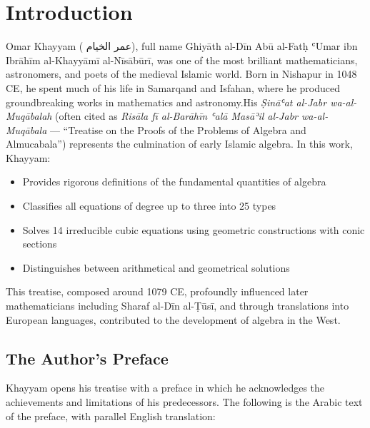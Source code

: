 \clearpage

\tableofcontents

\clearpage

\section{Introduction}

\label{sec:intro}

Omar Khayyam (
\textarabic{عمر الخيام}), full name Ghiyāth al-Dīn Abū al-Fatḥ ʿUmar ibn Ibrāhīm al-Khayyāmī al-Nīsābūrī, was one of the most brilliant mathematicians, astronomers, and poets of the medieval Islamic world. Born in Nishapur in 1048 CE, he spent much of his life in Samarqand and Isfahan, where he produced groundbreaking works in mathematics and astronomy.His 
\textit{Ṣināʿat al-Jabr wa-al-Muqābalah} (often cited as 
\textit{Risāla fī al-Barāhīn ʿalā Masāʾil al-Jabr wa-al-Muqābala} --- ``Treatise on the Proofs of the Problems of Algebra and Almucabala'') represents the culmination of early Islamic algebra. In this work, Khayyam:

\begin{itemize}
[noitemsep]
\item Provides rigorous definitions of the fundamental quantities of algebra
\item Classifies all equations of degree up to three into 25 types
\item Solves 14 irreducible cubic equations using geometric constructions with conic sections
\item Distinguishes between arithmetical and geometrical solutions

\end{itemize}
This treatise, composed around 1079 CE, profoundly influenced later mathematicians including Sharaf al-Dīn al-Ṭūsī, and through translations into European languages, contributed to the development of algebra in the West.

\subsection{The Author's Preface}

\label{subsec:preface}
Khayyam opens his treatise with a preface in which he acknowledges the achievements and limitations of his predecessors.
The following is the Arabic text of the preface, with parallel English translation:

